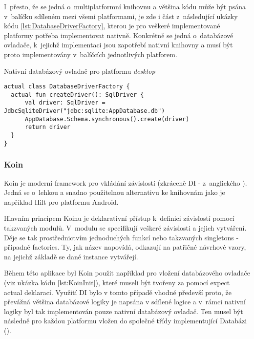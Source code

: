 I~přesto, že se jedná o~multiplatformní knihovnu a většina kódu může být psána v~balíčku sdíleném mezi všemi platformami, je zde i 
část z~následující ukázky kódu \ref{lst:DatabaseDriverFactory}, kterou je pro veškeré implementované platformy potřeba implementovat
nativně. Konkrétně se jedná o~databázové ovladače, k~jejichž implementaci jsou 
zapotřebí nativní knihovny a musí být proto implementovány v~balíčcích jednotlivých platforem.

\begin{listing}[H]
\caption{Nativní databázový ovladač pro platformu \textit{desktop}}\label{lst:DatabaseDriverFactory}
\begin{verbatim}
actual class DatabaseDriverFactory {
  actual fun createDriver(): SqlDriver {
      val driver: SqlDriver = JdbcSqliteDriver("jdbc:sqlite:AppDatabase.db")
      AppDatabase.Schema.synchronous().create(driver)
      return driver
  }
}
\end{verbatim}
\end{listing}

\subsubsection*{Koin}
Koin je moderní framework pro vkládání závislostí (zkráceně DI - z~anglického ). Jedná se o~lehkou a snadno 
použitelnou alternativu ke knihovnám jako je například Hilt pro platformu Android.

Hlavním principem Koinu je deklarativní přístup k~definici závislostí pomocí takzvaných modulů. V~modulu se specifikují veškeré závislosti a 
jejich vytváření. Děje se tak prostřednictvím jednoduchých funkcí nebo takzvaných singletons - případně factories. Ty, jak název napovídá, odkazují na 
patřičné návrhové vzory, na jejichž základě se dané instance vytvářejí.


Během této aplikace byl Koin použit například pro vložení databázového ovladače (viz ukázka kódu \ref{lst:KoinInit}), které museli být tvořeny za pomocí expect 
actual deklarací.
Využití DI bylo v tomto případě vhodné předevší proto, že převážná většina databázové logiky je napsána v sdílené 
logice a v~rámci nativní logiky byl tak implementován pouze nativní databázový ovladač. Ten musel být následně pro každou platformu vložen do 
společné třídy implementující Databázi ().

